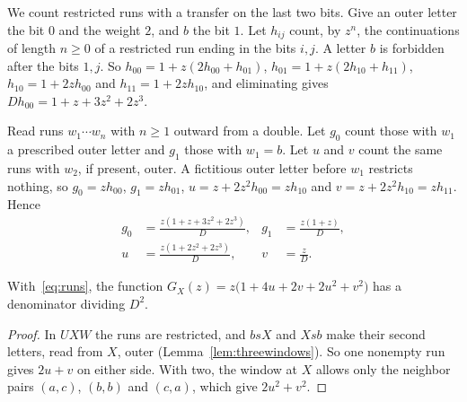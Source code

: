 We count restricted runs with a transfer on the last two bits. Give an outer letter the bit
$0$ and the weight $2$, and $b$ the bit $1$. Let $h_{ij}$ count,
by $z^n$, the continuations of length $n\ge0$ of a restricted run ending in the bits $i,j$. A letter $b$ is forbidden after the bits
$1,j$. So $h_{00}=1+z(2h_{00}+h_{01})$, $h_{01}=1+z(2h_{10}+h_{11})$, $h_{10}=1+2zh_{00}$ and
$h_{11}=1+2zh_{10}$, and eliminating gives $Dh_{00}=1+z+3z^2+2z^3$.

Read runs $w_1\cdots w_n$ with
$n\ge1$ outward from a double. Let $g_0$ count those with $w_1$ a prescribed outer letter and
$g_1$ those with $w_1=b$. Let $u$ and $v$ count the same runs with $w_2$, if present, outer. A fictitious outer letter before $w_1$ restricts nothing, so $g_0=zh_{00}$,
$g_1=zh_{01}$, $u=z+2z^2h_{00}=zh_{10}$ and $v=z+2z^2h_{10}=zh_{11}$. Hence
\begin{equation}\label{eq:runs}
\begin{aligned}
g_0&=\frac{z(1+z+3z^2+2z^3)}D,& g_1&=\frac{z(1+z)}D,\\
u&=\frac{z(1+2z^2+2z^3)}D,& v&=\frac zD.
\end{aligned}
\end{equation}

\begin{proposition}\label{prop:GX}
With~\eqref{eq:runs}, the function $G_X(z)=z\bigl(1+4u+2v+2u^2+v^2\bigr)$ has a denominator
dividing $D^2$.
\end{proposition}

\begin{proof}
In $UXW$ the runs are restricted, and $bsX$ and $Xsb$ make their second letters, read from
$X$, outer (Lemma~\ref{lem:threewindows}). So one nonempty run gives $2u+v$ on either side. With two, the window at $X$ allows only the neighbor pairs $(a,c)$, $(b,b)$ and
$(c,a)$, which give $2u^2+v^2$.
\end{proof}

